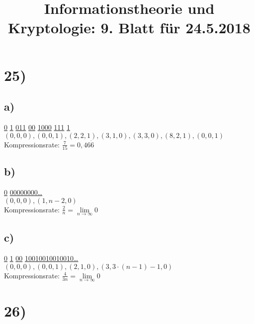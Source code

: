 %



  \title{Informationstheorie und Kryptologie: 9. Blatt für 24.5.2018}
  \maketitle

  \section*{25)}

    \subsection*{a)}

      \underline{0} \underline{1} \underline{011} \underline{00} \underline{1000} \underline{111} \underline{1} \\

      $(0,0,0), (0,0,1), (2,2,1), (3,1,0), (3,3,0), (8,2,1), (0,0,1)$\\

      Kompressionsrate: $\frac{7}{15} = 0,46\dot{6}$

    \subsection*{b)}

      \underline{0} \underline{00000000\ldots}\\

      $(0,0,0), (1,n-2,0)$\\

      Kompressionsrate: $\frac{2}{n} = \lim\limits_{n \rightarrow \infty}{0}$

    \subsection*{c)}

      \underline{0} \underline{1} \underline{00} \underline{10010010010010\ldots}\\

      $(0,0,0), (0,0,1), (2,1,0), (3,3 \cdot (n - 1) - 1,0)$\\

      Kompressionsrate: $\frac{4}{3n} = \lim\limits_{n \rightarrow \infty}{0}$

  \section*{26)}

